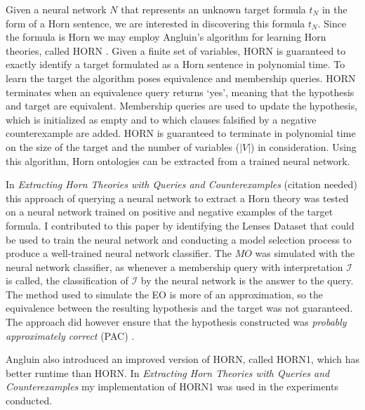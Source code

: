 Given a neural network $N$ that represents an unknown target formula $t_N$ in the form of a Horn sentence, we are interested in discovering this formula $t_N$. Since the formula is Horn we may employ Angluin's algorithm for learning Horn theories, called HORN \cite{DBLP:journals/ml/AngluinFP92}. Given a finite set of variables, HORN is guaranteed to exactly identify a target formulated as a Horn sentence in polynomial time. To learn the target the algorithm poses equivalence and membership queries. HORN terminates when an equivalence query returns `yes', meaning that the hypothesis and target are equivalent. Membership queries are used to update the hypothesis, which is initialized as empty and to which clauses falsified by a negative counterexample are added. HORN is guaranteed to terminate in polynomial time on the size of the target and the number of variables ($|V|$) in consideration. Using this algorithm, Horn ontologies can be extracted from a trained neural network.

In \emph{Extracting Horn Theories with Queries and Counterexamples} (citation needed) this approach of querying a neural network to extract a Horn theory was tested on a neural network trained on positive and negative examples of the target formula. I contributed to this paper by identifying the Lenses Dataset \cite{Dua:2019} that could be used to train the neural network and conducting a model selection process to produce a well-trained neural network classifier. The $MO$ was simulated with the neural network classifier, as whenever a membership query with interpretation $\mathcal{I}$ is called, the classification of $\mathcal{I}$ by the neural network is the answer to the query. The method used to simulate the EO is more of an approximation, so the equivalence between the resulting hypothesis and the target was not guaranteed. The approach did however ensure that the hypothesis constructed was \emph{probably approximately correct} (PAC) \cite{Valiant}.

Angluin also introduced an improved version of HORN, called HORN1, which has better runtime than HORN. In \emph{Extracting Horn Theories with Queries and Counterexamples} my implementation of HORN1 was used in the experiments conducted.

